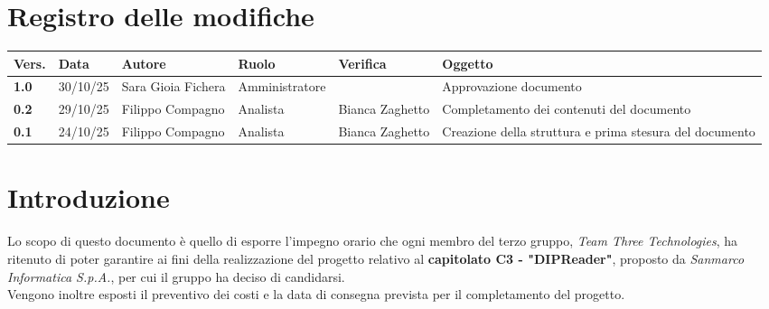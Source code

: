 \documentclass[a4paper,12pt]{article}
\begin{document}
    

    \section*{Registro delle modifiche} {
        \begin{table}[h!]
                \begin{tabularx}{\textwidth}{|l|l|l|l|L|L|}
                \hline
                \textbf{Vers.} & \textbf{Data} & \textbf{Autore} & \textbf{Ruolo} & \textbf{Verifica} & \textbf{Oggetto} \\
                \hline
                \textbf{1.0} & 30/10/25 & Sara Gioia Fichera & Amministratore &  & Approvazione documento \\
                \hline
                \textbf{0.2} & 29/10/25 & Filippo Compagno & Analista & Bianca Zaghetto & Completamento dei contenuti del documento \\
                \hline
                \textbf{0.1} & 24/10/25 & Filippo Compagno & Analista & Bianca Zaghetto & Creazione della struttura e prima stesura del documento \\
                \hline
            \end{tabularx}
        \end{table}
    }
    \newpage
    
    \tableofcontents
    \newpage
    
    \section{Introduzione} {
        Lo scopo di questo documento è quello di esporre l'impegno orario che ogni membro del terzo gruppo, \textit{Team Three Technologies}, ha ritenuto di poter garantire ai fini della realizzazione del progetto relativo al \textbf{capitolato C3 - "DIPReader"}, proposto da \textit{Sanmarco Informatica S.p.A.}, per cui il gruppo ha deciso di candidarsi.\\
        Vengono inoltre esposti il preventivo dei costi e la data di consegna prevista per il completamento del progetto.
    }
\end{document}
